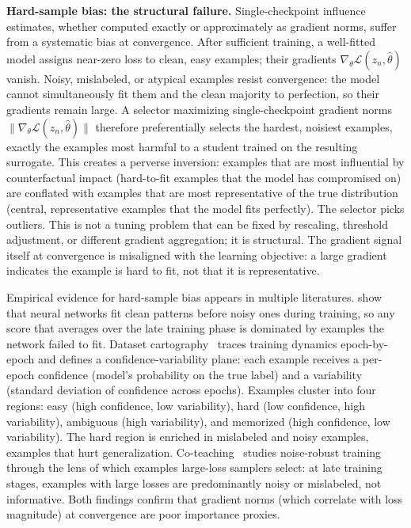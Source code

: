 \begin{foldable}
  \textbf{Hard-sample bias: the structural failure.}
  Single-checkpoint influence estimates, whether computed exactly or approximately as gradient norms, suffer from a systematic bias at convergence.
  After sufficient training, a well-fitted model assigns near-zero loss to clean, easy examples; their gradients $\nabla_\theta \mathcal{L}(z_n, \hat\theta)$ vanish.
  Noisy, mislabeled, or atypical examples resist convergence: the model cannot simultaneously fit them and the clean majority to perfection, so their gradients remain large.
  A selector maximizing single-checkpoint gradient norms $\|\nabla_\theta \mathcal{L}(z_n, \hat\theta)\|$ therefore preferentially selects the hardest, noisiest examples, exactly the examples most harmful to a student trained on the resulting surrogate.
  This creates a perverse inversion: examples that are most influential by counterfactual impact (hard-to-fit examples that the model has compromised on) are conflated with examples that are most representative of the true distribution (central, representative examples that the model fits perfectly).
  The selector picks outliers.
  This is not a tuning problem that can be fixed by rescaling, threshold adjustment, or different gradient aggregation; it is structural.
  The gradient signal itself at convergence is misaligned with the learning objective: a large gradient indicates the example is hard to fit, not that it is representative.
\end{foldable}

\begin{foldable}
  Empirical evidence for hard-sample bias appears in multiple literatures.
  \cite{arpit2017closer} show that neural networks fit clean patterns before noisy ones during training, so any score that averages over the late training phase is dominated by examples the network failed to fit.
  Dataset cartography~\cite{swayamdipta2020dataset} traces training dynamics epoch-by-epoch and defines a confidence-variability plane: each example receives a per-epoch confidence (model's probability on the true label) and a variability (standard deviation of confidence across epochs).
  Examples cluster into four regions: easy (high confidence, low variability), hard (low confidence, high variability), ambiguous (high variability), and memorized (high confidence, low variability).
  The hard region is enriched in mislabeled and noisy examples, examples that hurt generalization.
  Co-teaching~\cite{han2018co} studies noise-robust training through the lens of which examples large-loss samplers select: at late training stages, examples with large losses are predominantly noisy or mislabeled, not informative.
  Both findings confirm that gradient norms (which correlate with loss magnitude) at convergence are poor importance proxies.
\end{foldable}

